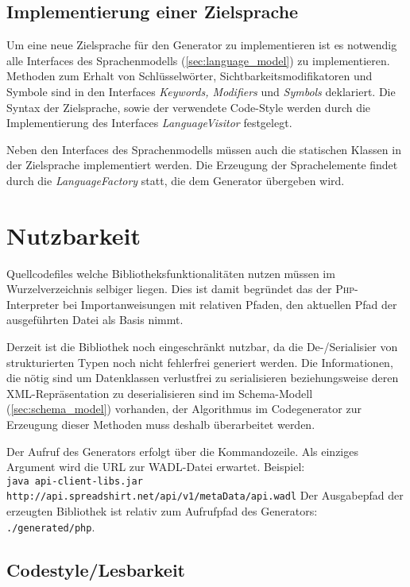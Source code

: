 \subsection{Implementierung einer Zielsprache}
\label{sec:target_language_implementation}

Um eine neue Zielsprache für den Generator zu implementieren ist es notwendig alle Interfaces des Sprachenmodells (\cref{sec:language_model}) zu implementieren. Methoden zum Erhalt von Schlüsselwörter, Sichtbarkeitsmodifikatoren und Symbole sind in den Interfaces \emph{Keywords, Modifiers} und \emph{Symbols} deklariert. Die Syntax der Zielsprache, sowie der verwendete Code-Style werden durch die Implementierung des Interfaces \emph{LanguageVisitor} festgelegt.

Neben den Interfaces des Sprachenmodells müssen auch die statischen Klassen in der Zielsprache implementiert werden. Die Erzeugung der Sprachelemente findet durch die \emph{LanguageFactory} statt, die dem Generator übergeben wird.

\section{Nutzbarkeit}
\label{sec:usability}

Quellcodefiles welche Bibliotheksfunktionalitäten nutzen müssen im Wurzelverzeichnis selbiger liegen. Dies ist damit begründet das der \textsc{Php}-Interpreter bei Importanweisungen mit relativen Pfaden, den aktuellen Pfad der ausgeführten Datei als Basis nimmt.

Derzeit ist die Bibliothek noch eingeschränkt nutzbar, da die De-/Serialisier von strukturierten Typen noch nicht fehlerfrei generiert werden. Die Informationen, die nötig sind um Datenklassen verlustfrei zu serialisieren beziehungsweise deren \gls{XML}-Repräsentation zu deserialisieren sind im Schema-Modell (\cref{sec:schema_model}) vorhanden, der Algorithmus im Codegenerator zur Erzeugung dieser Methoden muss deshalb überarbeitet werden.

Der Aufruf des Generators erfolgt über die Kommandozeile. Als einziges Argument wird die \gls{URL} zur \gls{WADL}-Datei erwartet. Beispiel:\\ 
\texttt{java api-client-libs.jar http://api.spreadshirt.net/api/v1/metaData/api.wadl}
Der Ausgabepfad der erzeugten Bibliothek ist relativ zum Aufrufpfad des Generators: \texttt{./generated/php}.

\subsection{Codestyle/Lesbarkeit}
\label{se:code_style_readability}

